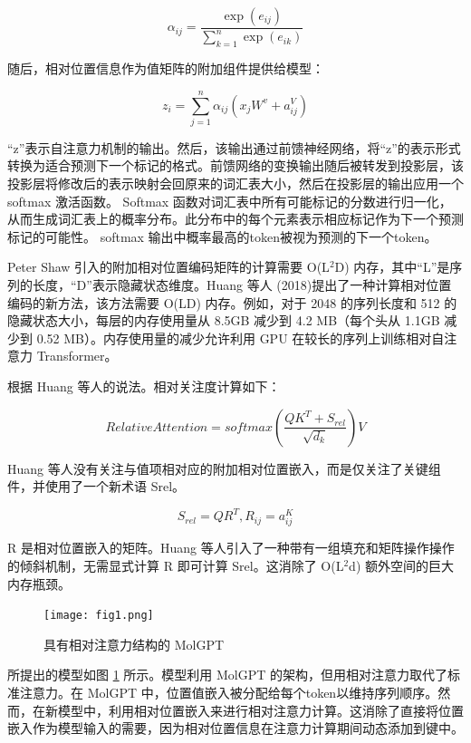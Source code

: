 \begin{equation}
  \alpha_{ij} = \frac{\exp \left( e_{ij} \right)}{\sum_{k=1}^n \exp \left( e_{ik} \right)}
\end{equation}

随后，相对位置信息作为值矩阵的附加组件提供给模型：

\begin{equation}
  z_i = \sum_{j=1}^n \alpha_{ij} \left( x_jW^{v} + a_{ij}^V \right)
\end{equation}

“z”表示自注意力机制的输出。然后，该输出通过前馈神经网络，将“z”的表示形式转换为适合预测下一个标记的格式。前馈网络的变换输出随后被转发到投影层，该投影层将修改后的表示映射会回原来的词汇表大小，然后在投影层的输出应用一个 softmax 激活函数。 Softmax 函数对词汇表中所有可能标记的分数进行归一化，从而生成词汇表上的概率分布。此分布中的每个元素表示相应标记作为下一个预测标记的可能性。 softmax 输出中概率最高的token被视为预测的下一个token。

Peter Shaw 引入的附加相对位置编码矩阵的计算需要 O(L$^2$D) 内存，其中“L”是序列的长度，“D”表示隐藏状态维度。Huang 等人 (2018)提出了一种计算相对位置编码的新方法，该方法需要 O(LD) 内存。例如，对于 2048 的序列长度和 512 的隐藏状态大小，每层的内存使用量从 8.5GB 减少到 4.2 MB（每个头从 1.1GB 减少到 0.52 MB）。内存使用量的减少允许利用 GPU 在较长的序列上训练相对自注意力 Transformer。

根据 Huang 等人的说法。相对关注度计算如下：

\begin{equation}
  Relative Attention = softmax \left( \frac{QK^T + S_{rel}}{\sqrt{d_k}} \right)V
\end{equation}

Huang 等人没有关注与值项相对应的附加相对位置嵌入，而是仅关注了关键组件，并使用了一个新术语 Srel。

\begin{equation}
  S_{rel} = QR^T, R_{ij} = a_{ij}^K
\end{equation}

R 是相对位置嵌入的矩阵。Huang 等人引入了一种带有一组填充和矩阵操作操作的倾斜机制，无需显式计算 R 即可计算 Srel。这消除了 O(L$^2$d) 额外空间的巨大内存瓶颈。

\begin{figure}[H]
  \centering
  \texttt{[image: fig1.png]}
  \caption{具有相对注意力结构的 MolGPT}
  \label{fig:1}
\end{figure}


所提出的模型如图 \ref{fig:1} 所示。模型利用 MolGPT 的架构，但用相对注意力取代了标准注意力。在 MolGPT 中，位置值嵌入被分配给每个token以维持序列顺序。然而，在新模型中，利用相对位置嵌入来进行相对注意力计算。这消除了直接将位置嵌入作为模型输入的需要，因为相对位置信息在注意力计算期间动态添加到键中。

